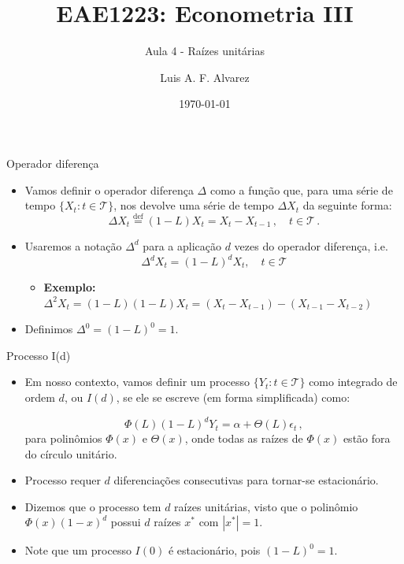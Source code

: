 \documentclass[11pt]{beamer}
\author{Luis A. F. Alvarez}
\title{EAE1223: Econometria III}
\subtitle{Aula 4 - Raízes unitárias}
\date{\today}
\begin{document}
\begin{frame}[plain]
	\maketitle
\end{frame}
\begin{frame}{Operador diferença}
	\begin{itemize}
		\item Vamos definir o operador diferença $\Delta$ como a função que, para uma série de tempo $\{X_t : t \in \mathcal{T}\}$, nos devolve uma série de tempo $\Delta X_t$ da seguinte forma:
		$$\Delta X_t \overset{\operatorname{def}}{=} (1-L)X_t = X_t - X_{t-1}\,, \quad t \in \mathcal{T}\, .$$
		\item Usaremos a notação $\Delta^d$ para a aplicação $d$ vezes do operador diferença, i.e.
		$$\Delta^d X_t = (1-L)^d X_t , \quad  t \in \mathcal{T}$$
		\begin{itemize}
			\item \textbf{Exemplo:} $\Delta^2 X_t = (1-L)(1-L)X_t = (X_t - X_{t-1}) - (X_{t-1} - X_{t-2})$
		\end{itemize}
		\vspace{1em}
		\item Definimos $\Delta^0 =(1-L)^0 = 1$.
	\end{itemize}
\end{frame}
\begin{frame}{Processo I(d)}
	\begin{itemize}
		\item Em nosso contexto, vamos definir um processo $\{Y_t:t \in \mathcal{T}\}$ {\color{blue}como integrado de ordem $d$, ou $I(d)$}, se ele se escreve (em forma simplificada) como:
		
		$$\Phi(L)(1-L)^dY_t = \alpha + \Theta(L) \epsilon_t \, ,$$
		para polinômios $\Phi(x)$ e $\Theta(x)$, onde todas as raízes de $\Phi(x)$ estão fora do círculo unitário.
		\item Processo requer $d$ diferenciações consecutivas para tornar-se estacionário.
		\item Dizemos que o processo tem $d$ raízes unitárias, visto que o polinômio $\Phi(x)(1-x)^d$ possui $d$ raízes $x^*$ com $|x^*|=1$.
		\item Note que um processo $I(0)$ é estacionário, pois $(1-L)^0=1$.
	\end{itemize}
\end{frame}
\end{document}
